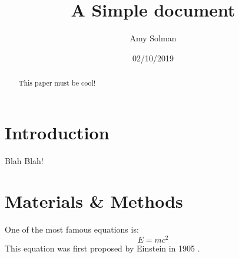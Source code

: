 \documentclass[12pt]{article}
\title{A Simple document}
\author{Amy Solman}
\date{02/10/2019}
\begin{document}
  \maketitle

  \begin{abstract}
    This paper must be cool!
  \end{abstract}
  
  \section{Introduction}
    Blah Blah!

  \section{Materials \& Methods}
  One of the most famous equations is:
  \begin{equation}
    E=mc^2
  \end{equation}
  This equation was first proposed by Einstein in 1905
  \cite{einstein1905does}.

  
  
\end{document}
